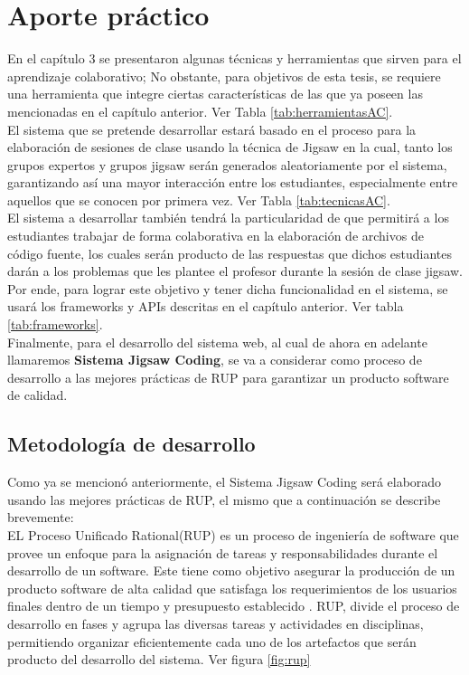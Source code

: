\chapter{Aporte práctico}

En el capítulo 3 se presentaron algunas técnicas y herramientas que sirven para el aprendizaje colaborativo; No obstante, para objetivos de esta tesis, se requiere una herramienta que integre ciertas características de las que ya poseen las mencionadas en el capítulo anterior. Ver Tabla \ref{tab:herramientasAC}.\\

El sistema que se pretende desarrollar estará basado en el proceso para la elaboración de sesiones de clase usando la técnica de Jigsaw en la cual, tanto los grupos expertos y grupos jigsaw serán generados aleatoriamente por el sistema, garantizando así una mayor interacción entre los estudiantes, especialmente entre aquellos que se conocen por primera vez. Ver Tabla \ref{tab:tecnicasAC}.\\

El sistema a desarrollar también tendrá la particularidad de que permitirá a los estudiantes trabajar de forma colaborativa en la elaboración de archivos de código fuente, los cuales serán producto de las respuestas que dichos estudiantes darán a los problemas que les plantee el profesor durante la sesión de clase jigsaw. Por ende, para lograr este objetivo y tener dicha funcionalidad en el sistema, se usará los frameworks y APIs descritas en el capítulo anterior. Ver tabla \ref{tab:frameworks}.\\

Finalmente, para el desarrollo del sistema web, al cual de ahora en adelante llamaremos \textbf{Sistema Jigsaw Coding}, se va a considerar como proceso de desarrollo a las mejores prácticas de RUP para garantizar un producto software de calidad.

\section{Metodología de desarrollo}
Como ya se mencionó anteriormente, el Sistema Jigsaw Coding será elaborado usando las mejores prácticas de RUP, el mismo que a continuación se describe brevemente:\\

EL Proceso Unificado Rational(RUP) es un proceso de ingeniería de software que provee un enfoque para la asignación de tareas y responsabilidades durante el desarrollo de un software. Este tiene como objetivo asegurar la producción de un producto software de alta calidad que satisfaga los requerimientos de los usuarios finales dentro de un tiempo y presupuesto establecido \cite{rup_ibm_2014}. RUP, divide el proceso de desarrollo en fases y agrupa las diversas tareas y actividades en disciplinas, permitiendo organizar eficientemente cada uno de los artefactos que serán producto del desarrollo del sistema. Ver figura \ref{fig:rup}\\


